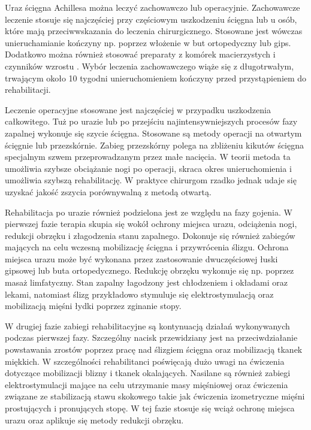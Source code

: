 Uraz ścięgna Achillesa można leczyć zachowawczo lub operacyjnie. Zachowawcze leczenie stosuje się najczęściej przy częściowym uszkodzeniu ścięgna lub u osób, które mają przeciwwskazania do leczenia chirurgicznego. Stosowane jest wówczas unieruchamianie kończyny np. poprzez włożenie w but ortopedyczny lub gips. Dodatkowo można również stosować preparaty z komórek macierzystych i czynników wzrostu \cite{CMC}. Wybór leczenia zachowawczego wiąże się z długotrwałym, trwającym około 10 tygodni unieruchomieniem kończyny przed przystąpieniem do rehabilitacji.

Leczenie operacyjne stosowane jest najczęściej w przypadku uszkodzenia całkowitego. Tuż po urazie lub po przejściu najintensywniejszych procesów fazy zapalnej wykonuje się szycie ścięgna. Stosowane są metody operacji na otwartym ścięgnie lub przezskórnie. Zabieg przezskórny polega na zbliżeniu kikutów ścięgna specjalnym szwem przeprowadzanym przez małe nacięcia. W teorii metoda ta umożliwia szybsze obciążanie nogi po operacji, skraca okres unieruchomienia i umożliwia szybszą rehabilitację. W praktyce chirurgom rzadko jednak udaje się uzyskać jakość zszycia porównywalną z metodą otwartą. 

Rehabilitacja po urazie również podzielona jest ze względu na fazy gojenia. W pierwszej fazie terapia skupia się wokół ochrony miejsca urazu, odciążenia nogi, redukcji obrzęku i złagodzenia stanu zapalnego. Dokonuje się również zabiegów mających na celu wczesną mobilizację ścięgna i przywrócenia ślizgu. Ochrona miejsca urazu może być wykonana przez zastosowanie dwuczęściowej łuski gipsowej lub buta ortopedycznego. Redukcję obrzęku wykonuje się np. poprzez masaż limfatyczny. Stan zapalny łagodzony jest chłodzeniem i okładami oraz lekami, natomiast ślizg przykładowo stymuluje się elektrostymulacją oraz mobilizacją mięśni łydki poprzez zginanie stopy.

W drugiej fazie zabiegi rehabilitacyjne są kontynuacją działań wykonywanych podczas pierwszej fazy. Szczególny nacisk przewidziany jest na przeciwdziałanie powstawania zrostów poprzez pracę nad ślizgiem ścięgna oraz mobilizacją tkanek miękkich. W szczególności rehabilitanci poświęcają dużo uwagi na ćwiczenia dotyczące mobilizacji blizny i tkanek okalających. Nasilane są również zabiegi elektrostymulacji mające na celu utrzymanie masy mięśniowej oraz ćwiczenia związane ze stabilizacją stawu skokowego takie jak ćwiczenia izometryczne mięśni prostujących i pronujących stopę. W tej fazie stosuje się wciąż ochronę miejsca urazu oraz aplikuje się metody redukcji obrzęku.

